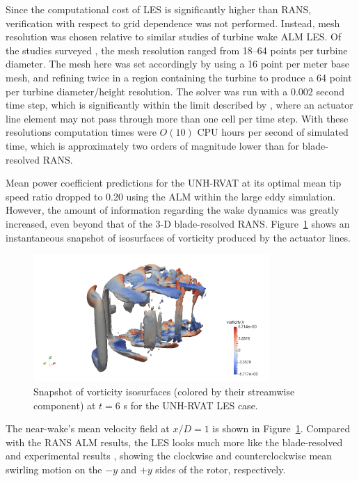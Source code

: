 \documentclass[times]{weauth}
\begin{document}
Since the computational cost of LES is significantly higher than RANS,
verification with respect to grid dependence was not performed. Instead, mesh
resolution was chosen relative to similar studies of turbine wake ALM LES. Of
the studies surveyed
\cite{Shamsoddin2014,Archer2013,Martinez-Tossas2015a,Troldborg2007}, the mesh
resolution ranged from 18--64 points per turbine diameter. The mesh here was set
accordingly by using a 16 point per meter base mesh, and refining twice in a
region containing the turbine to produce a 64 point per turbine diameter/height
resolution. The solver was run with a 0.002 second time step, which is
significantly within the limit described by \cite{Martinez-Tossas2015}, where an
actuator line element may not pass through more than one cell per time step.
With these resolutions computation times were $O(10)$ CPU hours per second of
simulated time, which is approximately two orders of magnitude lower than for
blade-resolved RANS.

Mean power coefficient predictions for the UNH-RVAT at its optimal mean tip
speed ratio dropped to 0.20 using the ALM within the large eddy simulation.
However, the amount of information regarding the wake dynamics was greatly
increased, even beyond that of the 3-D blade-resolved RANS.
Figure~\ref{RVAT-ALM-LES-vorticity} shows an instantaneous snapshot of
isosurfaces of vorticity produced by the actuator lines.

\begin{figure}
    \centering

    \includegraphics[width=0.8\textwidth]{RVAT-ALM-LES_vorticity-snapshot}

    \caption{Snapshot of vorticity isosurfaces (colored by their streamwise
        component) at $t=6$ s for the UNH-RVAT LES case.}

    \label{RVAT-ALM-LES-vorticity}
\end{figure}

The near-wake's mean velocity field at $x/D=1$ is shown in
Figure~\ref{RVAT-ALM-LES-vorticity}. Compared with the RANS ALM results, the LES
looks much more like the blade-resolved and experimental results
\cite{Bachant2015-JoT}, showing the clockwise and counterclockwise mean swirling
motion on the $-y$ and $+y$ sides of the rotor, respectively.
\end{document}
